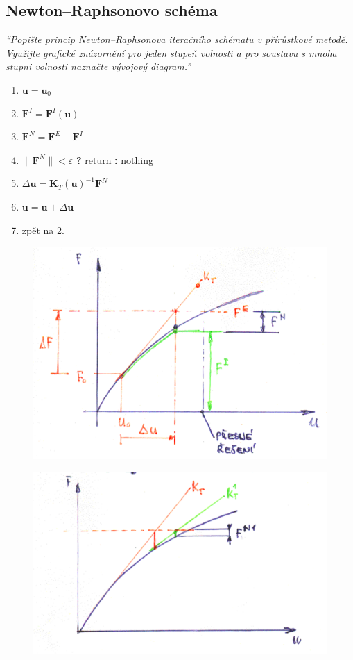 \documentclass{article}
\begin{document}
\begin{multicols}{2}
	\section{Newton–Raphsonovo schéma}
	\emph{``Popište princip Newton–Raphsonova iteračního schématu v přírůstkové metodě. Využijte grafické znázornění pro jeden stupeň volnosti a pro soustavu s mnoha stupni volnosti naznačte vývojový diagram.''}
	\begin{enumerate}
		\item $\bm{u} = \bm{u}_0$
		\item $\bm{F}^I = \bm{F}^I(\bm{u})$
		\item $\bm{F}^N = \bm{F}^E - \bm{F}^I$
		\item $\|\bm{F}^N\| < \varepsilon$ \textbf{?} return \textbf{:} nothing
		\item $\Delta \bm{u} = \bm{K}_T(\bm{u})^{-1} \bm{F}^N$
		\item $\bm{u} = \bm{u} + \Delta \bm{u}$
		\item zpět na 2.
	\end{enumerate}
	\begin{figure}[H]
		\centering
		\includegraphics[width=.8\linewidth]{figs/NR1.png}
	\end{figure}
	\begin{figure}[H]
		\centering
		\includegraphics[width=.8\linewidth]{figs/NR2.png}
	\end{figure}
	

\end{multicols}
\end{document}
